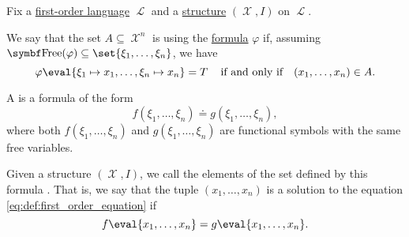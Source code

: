 \begin{definition}\label{def:first_order_definability}
  Fix a \hyperref[def:first_order_syntax]{first-order language} \( \mscrL \) and a \hyperref[def:first_order_structure]{structure} \( (\mscrX, I) \) on \( \mscrL \).

  We say that the set \( A \subseteq \mscrX^n \) is  using the \hyperref[def:first_order_syntax]{formula} \( \varphi \) if, assuming \( {\bfop{Free}(\varphi) \subseteq \set{ \xi_1, \ldots, \xi_n }} \), we have
  \begin{equation*}
    \varphi\eval{\xi_1 \mapsto x_1, \ldots, \xi_n \mapsto x_n} = T \quad\T{if and only if}\quad (x_1, \ldots, x_n) \in A.
  \end{equation*}
\end{definition}

\begin{definition}\label{def:first_order_equation}
  A  is a formula of the form
  \begin{equation}\label{eq:def:first_order_equation}
    f(\xi_1, \ldots, \xi_n) \doteq g(\xi_1, \ldots, \xi_n),
  \end{equation}
  where both \( f(\xi_1, \ldots, \xi_n) \) and \( g(\xi_1, \ldots, \xi_n) \) are functional symbols with the same free variables.

  Given a structure \( (\mscrX, I) \), we call the elements of the set defined by this formula . That is, we say that the tuple \( (x_1, \ldots, x_n) \) is a solution to the equation \eqref{eq:def:first_order_equation} if
  \begin{equation*}
    f\eval{x_1, \ldots, x_n} = g\eval{x_1, \ldots, x_n}.
  \end{equation*}
\end{definition}


